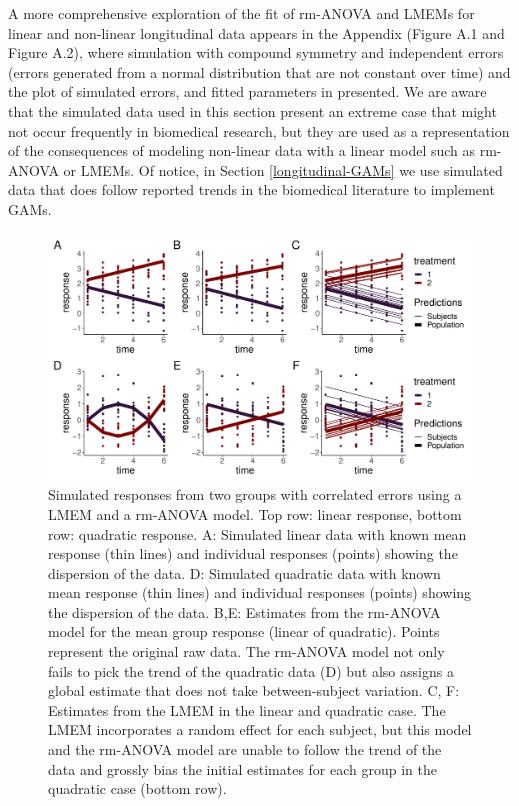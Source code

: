 \documentclass[
]{article}
\begin{document}
A more comprehensive exploration of the fit of rm-ANOVA and LMEMs for linear and non-linear longitudinal data appears in the Appendix (Figure A.1 and Figure A.2), where simulation with compound symmetry and independent errors (errors generated from a normal distribution that are not constant over time) and the plot of simulated errors, and fitted parameters in presented. We are aware that the simulated data used in this section present an extreme case that might not occur frequently in biomedical research, but they are used as a representation of the consequences of modeling non-linear data with a linear model such as rm-ANOVA or LMEMs. Of notice, in Section \ref{longitudinal-GAMs} we use simulated data that does follow reported trends in the biomedical literature to implement GAMs.



\begin{figure}

{\centering \includegraphics[width=1\linewidth]{Full_document_SIM_No_Appendix_files/figure-latex/l-q-response-1} 

}

\caption{Simulated responses from two groups with correlated errors using a LMEM and a rm-ANOVA model. Top row: linear response, bottom row: quadratic response. A: Simulated linear data with known mean response (thin lines) and individual responses (points) showing the dispersion of the data. D: Simulated quadratic data with known mean response (thin lines) and individual responses (points) showing the dispersion of the data. B,E: Estimates from the rm-ANOVA model for the mean group response (linear of quadratic). Points represent the original raw data. The rm-ANOVA model not only fails to pick the trend of the quadratic data (D) but also assigns a global estimate that does not take between-subject variation. C, F: Estimates from the LMEM in the linear and quadratic case. The LMEM incorporates a random effect for each subject, but this model and the rm-ANOVA model are unable to follow the trend of the data and grossly bias the initial estimates for each group in the quadratic case (bottom row).}\label{fig:l-q-response}
\end{figure}
\end{document}

